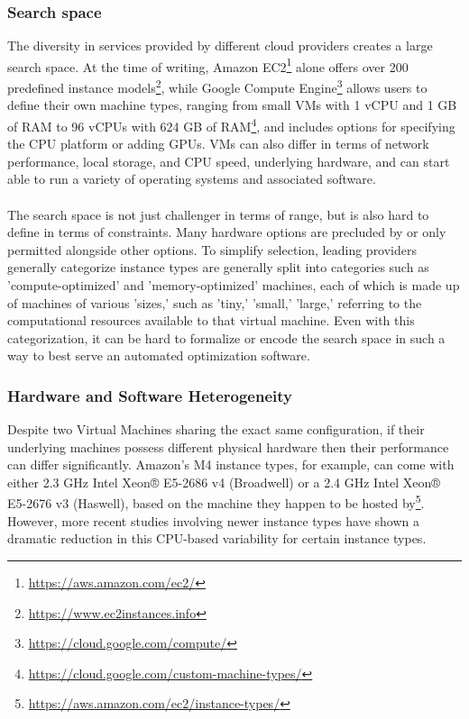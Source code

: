 \documentclass{report}
\begin{document}
\subsubsection{Search space}
The diversity in services provided by different cloud providers creates a large search space. At the time of writing, Amazon EC2\footnote{\url{https://aws.amazon.com/ec2/}} alone offers over 200 predefined instance models\footnote{\url{https://www.ec2instances.info}}, while Google Compute Engine\footnote{\url{https://cloud.google.com/compute/}} allows users to define their own machine types, ranging from small VMs with 1 vCPU and 1 GB of RAM to 96 vCPUs with 624 GB of RAM\footnote{\url{https://cloud.google.com/custom-machine-types/}}, and includes options for specifying the CPU platform or adding GPUs. VMs can also differ in terms of network performance, local storage, and CPU speed, underlying hardware, and can start able to run a variety of operating systems and associated software. 
\paragraph{}
The search space is not just challenger in terms of range, but is also hard to define in terms of constraints. Many hardware options are precluded by or only permitted alongside other options. To simplify selection, leading providers generally categorize instance types are generally split into categories such as 'compute-optimized' and 'memory-optimized' machines, each of which is made up of machines of various 'sizes,' such as 'tiny,' 'small,' 'large,' referring to the computational resources available to that virtual machine. Even with this categorization, it can be hard to formalize or encode the search space in such a way to best serve an automated optimization software.
\subsubsection{Hardware and Software Heterogeneity}
Despite two Virtual Machines sharing the exact same configuration, if their underlying machines possess different physical hardware then their performance can differ significantly\cite{Leitner2014}. Amazon's M4 instance types, for example, can come with either 2.3 GHz Intel Xeon® E5-2686 v4 (Broadwell) or a 2.4 GHz Intel Xeon® E5-2676 v3 (Haswell), based on the machine they happen to be hosted by\footnote{\url{https://aws.amazon.com/ec2/instance-types/}}. However, more recent studies involving newer instance types have shown a dramatic reduction in this CPU-based variability for certain instance types\cite{Davatz2017, Laaber2019}. 
\end{document}
